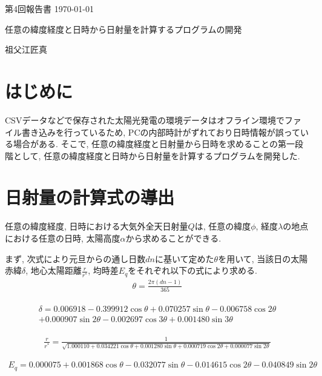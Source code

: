 \documentclass[a4j,12pt,]{jarticle}
\begin{document}
{\noindent\small 第4回報告書 \hfill\today}
\begin{center}
  {\Large 任意の緯度経度と日時から日射量を計算するプログラムの開発}
\end{center}
\begin{flushright}
  祖父江匠真 \\
\end{flushright}

\section{はじめに}
CSVデータなどで保存された太陽光発電の環境データはオフライン環境でファイル書き込みを行っているため, PCの内部時計がずれており日時情報が誤っている場合がある.
そこで, 任意の緯度経度と日射量から日時を求めることの第一段階として, 任意の緯度経度と日時から日射量を計算するプログラムを開発した.

\section{日射量の計算式の導出}
任意の緯度経度, 日時における大気外全天日射量$Q$は, 任意の緯度$\phi$, 経度$\lambda$の地点における任意の日時, 太陽高度$\alpha$から求めることができる.

まず, 次式により元旦からの通し日数$dn$に基いて定めた$\theta$を用いて, 当該日の太陽赤緯$\delta$, 地心太陽距離$\frac{r}{r^{*}}$, 均時差$E_q$をそれぞれ以下の式により求める.
\begin{eqnarray}
  \theta =  \frac{2\pi (dn-1)}{365}
\end{eqnarray}

\begin{eqnarray}
\begin{split}
  \delta =  0.006918-0.399912\cos \theta+0.070257\sin \theta-0.006758\cos 2\theta\\
  +0.000907\sin 2\theta-0.002697\cos 3\theta+0.001480\sin 3\theta
\end{split}
\end{eqnarray}

\begin{eqnarray}
  \frac{r}{r^{*}} =  \frac{1}{\sqrt{1.000110+0.034221\cos \theta+0.001280\sin \theta+0.000719\cos 2\theta+0.000077\sin 2\theta}}
\end{eqnarray}

\begin{eqnarray}
  E_q =  0.000075+0.001868\cos \theta-0.032077\sin \theta-0.014615\cos 2\theta-0.040849\sin 2\theta
\end{eqnarray}
\end{document}
